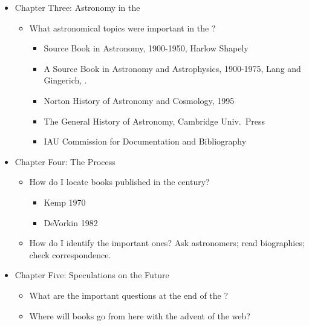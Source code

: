 \begin{itemize}
\item Chapter Three: Astronomy in the 
  \begin{itemize}
  \item What astronomical topics were important in the ?
    \begin{itemize}
    \item Source Book in Astronomy, 1900-1950, Harlow Shapely \cite{shapley:1960}
    \item A Source Book in Astronomy and Astrophysics, 1900-1975, Lang and Gingerich,
      \cite{lang:1978}.
    \item Norton History of Astronomy and Cosmology, 1995
    \item The General History of Astronomy, Cambridge Univ.\ Press
    \item IAU Commission for Documentation and Bibliography
    \end{itemize}	
  \end{itemize}
  
\item Chapter Four: The Process
  \begin{itemize}
  \item How do I locate books published in the century?
    \begin{itemize}
    \item Kemp 1970
    \item DeVorkin 1982
    \end{itemize}
  \item How do I identify the important ones? Ask astronomers; read biographies; check
    correspondence.
  \end{itemize}
  
\item Chapter Five: Speculations on the Future
  \begin{itemize}
  \item What are the important questions at the end of the ?
  \item Where will books go from here with the advent of the web?
  \end{itemize}
  
\end{itemize}
